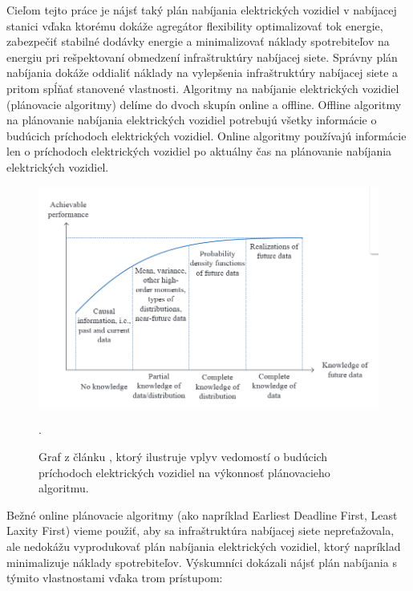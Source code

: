 
Cieľom tejto práce je nájsť taký plán nabíjania elektrických vozidiel v nabíjacej stanici vďaka ktorému dokáže agregátor flexibility optimalizovať tok energie, zabezpečiť stabilné dodávky energie a minimalizovať náklady spotrebiteľov na energiu pri rešpektovaní obmedzení infraštruktúry nabíjacej siete. Správny plán nabíjania dokáže oddialiť náklady na vylepšenia infraštruktúry nabíjacej siete a pritom spĺňať stanovené vlastnosti. Algoritmy na nabíjanie elektrických vozidiel (plánovacie algoritmy) delíme do dvoch skupín online a offline. Offline algoritmy na plánovanie nabíjania elektrických vozidiel potrebujú všetky informácie o budúcich príchodoch elektrických vozidiel. Online algoritmy používajú informácie len o príchodoch elektrických vozidiel po aktuálny čas na plánovanie nabíjania  elektrických vozidiel. 

\begin{figure}[H]
    \includegraphics[width=\textwidth]{images/future_knowledge_cars.png}
    \centering
    \caption[Vplyv vedomostí o budúcich príchodov elektromobilov na výkonnosť plánovacieho algoritmu.]{Graf z článku \cite{Tang2016OnlineCS}, ktorý ilustruje vplyv vedomostí o budúcich príchodoch elektrických vozidiel na výkonnosť plánovacieho algoritmu.}.
    \label{architectureacnsim:obr2}
    \end{figure}



Bežné online plánovacie algoritmy (ako napríklad Earliest Deadline First, Least Laxity First) vieme použiť, aby sa infraštruktúra nabíjacej siete nepreťažovala, ale nedokážu vyprodukovať plán nabíjania elektrických vozidiel, ktorý napríklad minimalizuje náklady spotrebiteľov.  \cite{lee2021adaptivephd,chen2021smoothed} Výskumníci dokázali nájsť plán nabíjania s týmito vlastnostami vďaka trom prístupom: 


